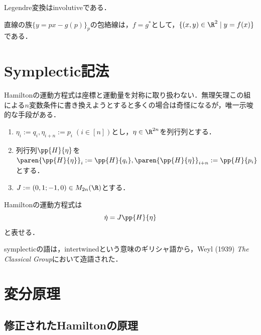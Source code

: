 \documentclass[uplatex,dvipdfmx]{jsreport}
\begin{document}
\begin{theorem}
    Legendre変換はinvolutiveである．
\end{theorem}

\begin{corollary}
    直線の族$\{y=px-g(p)\}_{p}$の包絡線は，$f=g^*$として，$\{(x,y)\in\R^2\mid y=f(x)\}$である．
\end{corollary}

\section{Symplectic記法}

\begin{tcolorbox}[colframe=ForestGreen, colback=ForestGreen!10!white,breakable,colbacktitle=ForestGreen!40!white,coltitle=black,fonttitle=\bfseries\sffamily,
title=]
    Hamiltonの運動方程式は座標と運動量を対称に取り扱わない．無理矢理この組による$n$変数条件に書き換えようとすると多くの場合は奇怪になるが，唯一示唆的な手段がある．
\end{tcolorbox}

\begin{definition}\mbox{}
    \begin{enumerate}
        \item $\eta_i:=q_i,\eta_{i+n}:=p_i\;(i\in[n])$とし，$\eta\in\R^{2n}$を列行列とする．
        \item 列行列$\pp{H}{\eta}$を$\paren{\pp{H}{\eta}}_i:=\pp{H}{q_i},\paren{\pp{H}{\eta}}_{i+n}:=\pp{H}{p_i}$とする．
        \item $J:=(0,1;-1,0)\in M_{2n}(\R)$とする．
    \end{enumerate}
\end{definition}

\begin{theorem}
    Hamiltonの運動方程式は
    \[\dot{\eta}=J\pp{H}{\eta}\]
    と表せる．
\end{theorem}
\begin{history}
    symplecticの語は，intertwinedという意味のギリシャ語から，Weyl (1939) \textit{The Classical Group}において造語された．
\end{history}

\section{変分原理}

\subsection{修正されたHamiltonの原理}
\end{document}
